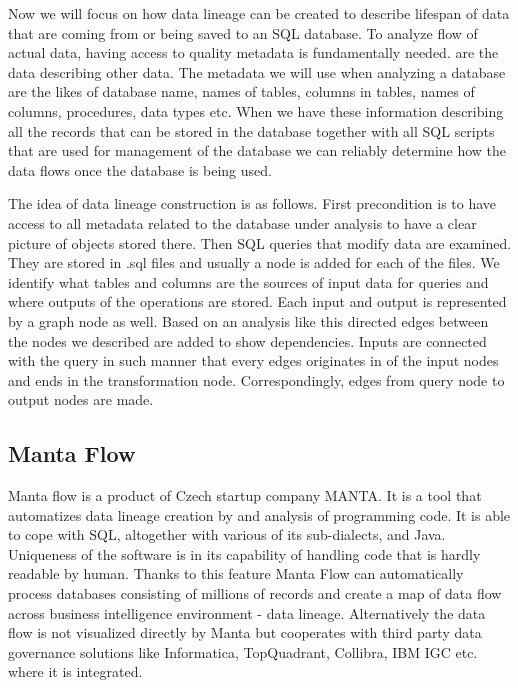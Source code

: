Now we will focus on how data lineage can be created to describe lifespan of data that are coming from or being saved to an SQL database.
To analyze flow of actual data, having access to quality metadata is fundamentally needed.
 are the data describing other data. The metadata we will use when analyzing a database are the likes of database name, names of tables, columns in tables, names of columns, procedures, data types etc.
When we have these information describing all the records that can be stored in the database together with all SQL scripts that are used for management of the database we can reliably determine how the data flows once the database is being used.

The idea of data lineage construction is as follows. First precondition is to have access to all metadata related to the database under analysis to have a clear picture of objects stored there. 
Then SQL queries that modify data are examined. They are stored in .sql files and usually a node is added for each of the files. We identify what tables and columns are the sources of input data for queries and where outputs of the operations are stored. Each input and output is represented by a graph node as well. Based on an analysis like this directed edges between the nodes we described are added to show dependencies. Inputs are connected with the query in such manner that every edges originates in of the input nodes and ends in the transformation node. Correspondingly, edges from query node to output nodes are made.




\subsection{Manta Flow}

Manta flow is a product of Czech startup company MANTA. It is a tool that automatizes data lineage creation by and analysis of programming code. It is able to cope with SQL, altogether with various of its sub-dialects, and Java. Uniqueness of the software is in its capability of handling code that is hardly readable by human. Thanks to this feature Manta Flow can automatically process databases consisting of millions of records and create a map of data flow across business intelligence environment - data lineage.
Alternatively the data flow is not visualized directly by Manta but cooperates with third party data governance solutions like Informatica, TopQuadrant, Collibra, IBM IGC etc. where it is integrated.

